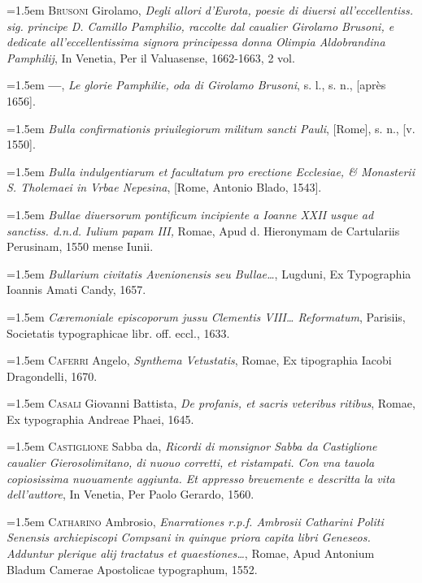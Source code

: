 \documentclass[12pt,twoside,openany]{book}
\newenvironment{PurhBibliography}
  {%
    \par
    \setlength{\parindent}{0pt}%
    \setlength{\leftskip}{0pt}%
  }
  {%
    \par
  }
\begin{document}
\begin{PurhBibliography}
\noindent\hangindent=1.5em \textsc{Brusoni} Girolamo, \textit{Degli allori d’Eurota, poesie di diuersi all’eccellentiss. sig. principe D. Camillo Pamphilio, raccolte dal caualier Girolamo Brusoni, e dedicate all’eccellentissima signora principessa donna Olimpia Aldobrandina Pamphilij}, In Venetia, Per il Valuasense, 1662-1663, 2 vol.\par
\noindent\hangindent=1.5em \textbf{—}, \textit{Le glorie Pamphilie, oda di Girolamo Brusoni}, s. l., s. n., [après 1656].\par
\noindent\hangindent=1.5em \textit{Bulla confirmationis priuilegiorum militum sancti Pauli}, [Rome], s. n., [v. 1550].\par
\noindent\hangindent=1.5em \textit{Bulla indulgentiarum et facultatum pro erectione Ecclesiae, \& Monasterii S. Tholemaei in Vrbae Nepesina}, [Rome, Antonio Blado, 1543].\par
\noindent\hangindent=1.5em \textit{Bullae diuersorum pontificum incipiente a Ioanne XXII usque ad sanctiss. d.n.d. Iulium papam III,} Romae, Apud d. Hieronymam de Cartulariis Perusinam, 1550 mense Iunii.\par
\noindent\hangindent=1.5em \textit{Bullarium civitatis Avenionensis seu Bullae…}, Lugduni, Ex Typographia Ioannis Amati Candy, 1657.\par
\noindent\hangindent=1.5em \textit{Cæremoniale episcoporum jussu Clementis VIII… Reformatum}, Parisiis, Societatis typographicae libr. off. eccl., 1633.\par
\noindent\hangindent=1.5em \textsc{Caferri} Angelo, \textit{Synthema Vetustatis}, Romae, Ex tipographia Iacobi Dragondelli, 1670.\par
\noindent\hangindent=1.5em \textsc{Casali} Giovanni Battista, \textit{De profanis, et sacris veteribus ritibus}, Romae, Ex typographia Andreae Phaei, 1645.\par
\noindent\hangindent=1.5em \textsc{Castiglione} Sabba da, \textit{Ricordi di monsignor Sabba da Castiglione caualier Gierosolimitano, di nuouo corretti, et ristampati. Con vna tauola copiosissima nuouamente aggiunta. Et appresso breuemente e descritta la vita dell’auttore}, In Venetia, Per Paolo Gerardo, 1560.\par
\noindent\hangindent=1.5em \textsc{Catharino} Ambrosio, \textit{Enarrationes r.p.f. Ambrosii Catharini Politi Senensis archiepiscopi Compsani in quinque priora capita libri Geneseos. Adduntur plerique alij tractatus et quaestiones…}, Romae, Apud Antonium Bladum Camerae Apostolicae typographum, 1552.\par

\end{PurhBibliography}
\end{document}
